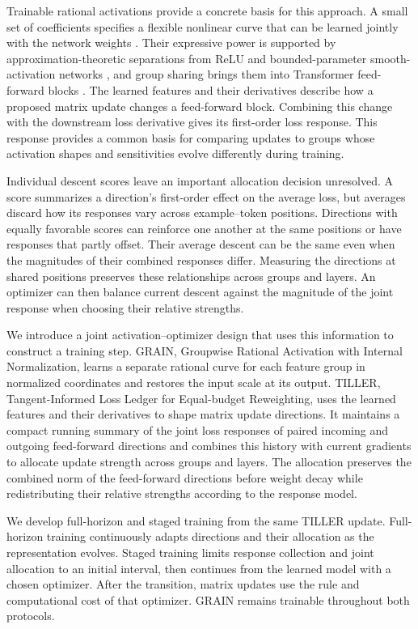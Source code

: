\documentclass{article}
\begin{document}
Trainable rational activations provide a concrete basis for this approach.
A small set of coefficients specifies a flexible nonlinear curve that can
be learned jointly with the network weights \citep{molina2020pade}.
Their expressive power is supported by approximation-theoretic
separations from ReLU and bounded-parameter smooth-activation networks
\citep{boulle2020rational,tang2026expressivity}, and group sharing brings
them into Transformer feed-forward blocks \citep{yang2025kat}.
The learned features and their derivatives describe how a proposed
matrix update changes a feed-forward block. Combining this change with
the downstream loss derivative gives its first-order loss response.
This response provides a common basis for comparing updates to groups
whose activation shapes and sensitivities evolve differently during
training.

Individual descent scores leave an important allocation decision
unresolved. A score summarizes a direction's first-order effect on the
average loss, but averages discard how its responses vary across
example--token positions. Directions with equally favorable scores can
reinforce one another at the same positions or have responses that
partly offset. Their average descent can be the same even when the
magnitudes of their combined responses differ. Measuring the directions
at shared positions preserves these relationships across groups and
layers. An optimizer can then balance current descent against the
magnitude of the joint response when choosing their relative strengths.

We introduce a joint activation--optimizer design that uses this
information to construct a training step. GRAIN, Groupwise Rational
Activation with Internal Normalization, learns a separate rational curve
for each feature group in normalized coordinates and restores the input
scale at its output. TILLER, Tangent-Informed Loss Ledger for Equal-budget
Reweighting, uses the learned features and their derivatives to shape
matrix update directions. It maintains a compact running summary of
the joint loss responses of paired incoming and outgoing feed-forward
directions and combines this history with current gradients to allocate update strength across
groups and layers. The allocation preserves the combined norm of the
feed-forward directions before weight decay while redistributing their
relative strengths according to the response model.

We develop full-horizon and staged training from the same TILLER update.
Full-horizon training continuously adapts directions and their allocation
as the representation evolves. Staged training limits response
collection and joint allocation to an initial interval, then continues
from the learned model with a chosen optimizer. After the transition,
matrix updates use the rule and computational cost of that optimizer.
GRAIN remains trainable throughout both protocols.
\end{document}
